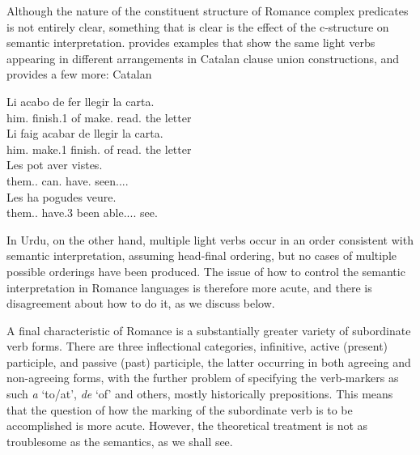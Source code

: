 \documentclass[output=paper,hidelinks]{langscibook}
\begin{document}
Although the nature of the constituent structure of Romance complex predicates is not
entirely clear, something that is clear is the effect of the c-structure on semantic interpretation.
\citet[238]{Alsina1997} provides examples that show the same light verbs appearing
in different arrangements in Catalan clause union constructions, and \citet[239]{Sola2002}
provides a few more:
\ea\label{layered} Catalan
\begin{xlist}
\ex
\gll Li acabo de fer llegir la carta.\\
him.{\DAT} finish.{1\SG} of make.{\INF} read.{\INF} the letter\\
\ex
\gll Li faig acabar de llegir la carta.\\
him.{\DAT} make.{1\SG} finish.{\INF} of read.{\INF} the letter\\
\ex
\gll Les pot aver vistes.\\
them.{\F.\PL} can.{\SG} have.{\INF} seen.{\PST.\PTCP.\F.\PL}\\
\ex
\gll Les ha pogudes veure.\\
them.{\F.\PL} have.{3\SG} {been able}.{\PST.\PTCP.\F.\PL} see.{\INF}\\
\end{xlist}
\z
In Urdu, on the other hand, multiple light verbs occur in an order consistent with
semantic interpretation, assuming head-final ordering, but no cases of multiple
possible orderings have been produced.  The issue of how to control the semantic
interpretation in Romance languages is therefore more acute, and there is disagreement
about how to do it, as we discuss below.

A final characteristic of Romance is a substantially greater variety of  subordinate verb
forms.  There are three inflectional categories, infinitive, active (present) participle,
and passive (past) participle, the latter occurring in both agreeing  and non-agreeing forms,
with the further problem of specifying the verb-markers as such \emph{a} `to/at', \emph{de} `of'
and others, mostly historically prepositions. This means that the question of how the marking
of the subordinate verb is to be accomplished is more acute.  However, the theoretical
treatment is not as troublesome as the semantics, as we shall see.
\end{document}
